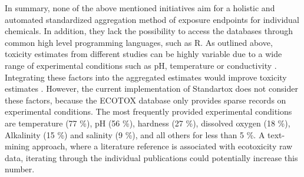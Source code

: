 In summary, none of the above mentioned initiatives aim for a holistic and automated standardized aggregation method of exposure endpoints for individual chemicals. In addition, they lack the possibility to access the databases through common high level programming languages, such as R. As outlined above, toxicity estimates from different studies can be highly variable due to a wide range of experimental conditions such as pH, temperature or conductivity \citep{rosenkrantz_influence_2013, li_temperature_2011}. Integrating these factors into the aggregated estimates would improve toxicity estimates . However, the current implementation of Standartox does not consider these factors, because the ECOTOX database only provides sparse records on experimental conditions. The most frequently provided experimental conditions are temperature (77 \%), pH (56 \%), hardness (27 \%), dissolved oxygen (18 \%), Alkalinity (15 \%) and salinity (9 \%), and all others for less than 5 \%. A text-mining approach, where a literature reference is associated with  ecotoxicity raw data, iterating through the individual publications could potentially increase this number.









